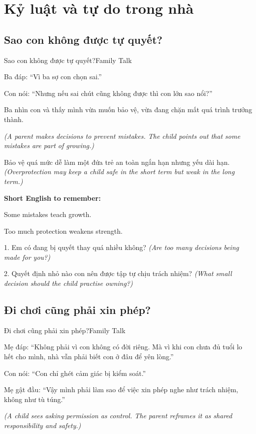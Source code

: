\chapter{Kỷ luật và tự do trong nhà}

\section{Sao con không được tự quyết?}
\begin{truyen}{Sao con không được tự quyết?}{Family Talk}

Ba đáp: ``Vì ba sợ con chọn sai.''

Con nói: ``Nhưng nếu sai chút cũng không được thì con lớn sao nổi?''

Ba nhìn con và thấy mình vừa muốn bảo vệ, vừa đang chặn mất quá trình trưởng thành.

\textit{(A parent makes decisions to prevent mistakes. The child points out that some mistakes are part of growing.)}
\end{truyen}

\begin{baihoc}
Bảo vệ quá mức dễ làm một đứa trẻ an toàn ngắn hạn nhưng yếu dài hạn.
\textit{(Overprotection may keep a child safe in the short term but weak in the long term.)}
\end{baihoc}

\begin{ghinhoanh}
\textbf{Short English to remember:}

Some mistakes teach growth.

Too much protection weakens strength.
\end{ghinhoanh}

\begin{tuhocnhanh}
1. Em có đang bị quyết thay quá nhiều không? \textit{(Are too many decisions being made for you?)}

2. Quyết định nhỏ nào con nên được tập tự chịu trách nhiệm? \textit{(What small decision should the child practise owning?)}
\end{tuhocnhanh}
\ngancach

\section{Đi chơi cũng phải xin phép?}
\begin{truyen}{Đi chơi cũng phải xin phép?}{Family Talk}

Mẹ đáp: ``Không phải vì con không có đời riêng. Mà vì khi con chưa đủ tuổi lo hết cho mình, nhà vẫn phải biết con ở đâu để yên lòng.''

Con nói: ``Con chỉ ghét cảm giác bị kiểm soát.''

Mẹ gật đầu: ``Vậy mình phải làm sao để việc xin phép nghe như trách nhiệm, không như tù túng.''

\textit{(A child sees asking permission as control. The parent reframes it as shared responsibility and safety.)}
\end{truyen}

